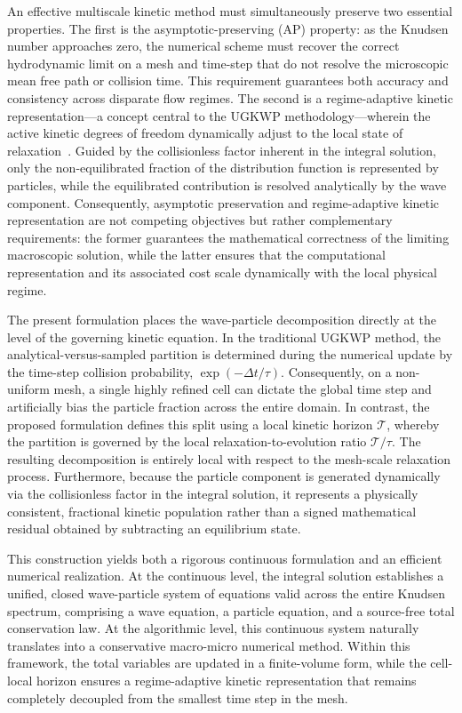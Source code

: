 \documentclass[preprint,12pt]{elsarticle}
\begin{document}
An effective multiscale kinetic method must simultaneously preserve two essential properties. The first is the asymptotic-preserving (AP) property: as the Knudsen number approaches zero, the numerical scheme must recover the correct hydrodynamic limit on a mesh and time-step that do not resolve the microscopic mean free path or collision time. This requirement guarantees both accuracy and consistency across disparate flow regimes. The second is a regime-adaptive kinetic representation---a concept central to the UGKWP methodology---wherein the active kinetic degrees of freedom dynamically adjust to the local state of relaxation~\cite{liu2020ugkwp,zhu2019ugkwp,li2020ugkwp}. Guided by the collisionless factor inherent in the integral solution, only the non-equilibrated fraction of the distribution function is represented by particles, while the equilibrated contribution is resolved analytically by the wave component. Consequently, asymptotic preservation and regime-adaptive kinetic representation are not competing objectives but rather complementary requirements: the former guarantees the mathematical correctness of the limiting macroscopic solution, while the latter ensures that the computational representation and its associated cost scale dynamically with the local physical regime.


The present formulation places the wave-particle decomposition directly at the level of the governing kinetic equation. In the traditional UGKWP method, the analytical-versus-sampled partition is determined during the numerical update by the time-step collision probability, $\exp{(-\Delta t/\tau)}$. Consequently, on a non-uniform mesh, a single highly refined cell can dictate the global time step and artificially bias the particle fraction across the entire domain. In contrast, the proposed formulation defines this split using a local kinetic horizon $\mathcal{T}$, whereby the partition is governed by the local relaxation-to-evolution ratio $\mathcal{T}/\tau$. The resulting decomposition is entirely local with respect to the mesh-scale relaxation process. Furthermore, because the particle component is generated dynamically via the collisionless factor in the integral solution, it represents a physically consistent, fractional kinetic population rather than a signed mathematical residual obtained by subtracting an equilibrium state.

This construction yields both a rigorous continuous formulation and an efficient numerical realization. At the continuous level, the integral solution establishes a unified, closed wave-particle system of equations valid across the entire Knudsen spectrum, comprising a wave equation, a particle equation, and a source-free total conservation law. At the algorithmic level, this continuous system naturally translates into a conservative macro-micro numerical method. Within this framework, the total variables are updated in a finite-volume form, while the cell-local horizon ensures a regime-adaptive kinetic representation that remains completely decoupled from the smallest time step in the mesh.
\end{document}
